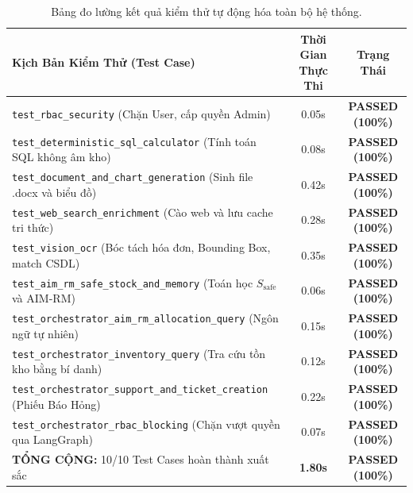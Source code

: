 \documentclass[11pt,a4paper]{article}
\begin{document}
\begin{benchmarkbox}
\begin{table}[H]
\centering
\footnotesize
\begin{tabularx}{\linewidth}{>{\raggedright\arraybackslash}Xcc}
\toprule
\textbf{Kịch Bản Kiểm Thử (Test Case)} & \textbf{Thời Gian Thực Thi} & \textbf{Trạng Thái} \\
\midrule
\texttt{test\_rbac\_security} (Chặn User, cấp quyền Admin) & 0.05s & \textbf{PASSED (100\%)} \\
\texttt{test\_deterministic\_sql\_calculator} (Tính toán SQL không âm kho) & 0.08s & \textbf{PASSED (100\%)} \\
\texttt{test\_document\_and\_chart\_generation} (Sinh file .docx và biểu đồ) & 0.42s & \textbf{PASSED (100\%)} \\
\texttt{test\_web\_search\_enrichment} (Cào web và lưu cache tri thức) & 0.28s & \textbf{PASSED (100\%)} \\
\texttt{test\_vision\_ocr} (Bóc tách hóa đơn, Bounding Box, match CSDL) & 0.35s & \textbf{PASSED (100\%)} \\
\texttt{test\_aim\_rm\_safe\_stock\_and\_memory} (Toán học $S_{\text{safe}}$ và AIM-RM) & 0.06s & \textbf{PASSED (100\%)} \\
\texttt{test\_orchestrator\_aim\_rm\_allocation\_query} (Ngôn ngữ tự nhiên) & 0.15s & \textbf{PASSED (100\%)} \\
\texttt{test\_orchestrator\_inventory\_query} (Tra cứu tồn kho bằng bí danh) & 0.12s & \textbf{PASSED (100\%)} \\
\texttt{test\_orchestrator\_support\_and\_ticket\_creation} (Phiếu Báo Hỏng) & 0.22s & \textbf{PASSED (100\%)} \\
\texttt{test\_orchestrator\_rbac\_blocking} (Chặn vượt quyền qua LangGraph) & 0.07s & \textbf{PASSED (100\%)} \\
\midrule
\textbf{TỔNG CỘNG:} 10/10 Test Cases hoàn thành xuất sắc & \textbf{1.80s} & \textbf{PASSED (100\%)} \\
\bottomrule
\end{tabularx}
\caption{Bảng đo lường kết quả kiểm thử tự động hóa toàn bộ hệ thống.}
\end{table}
\end{benchmarkbox}
\end{document}
